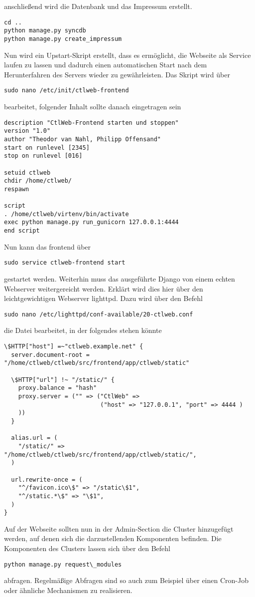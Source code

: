anschließend wird die Datenbank und das Impressum erstellt.
\begin{lstlisting}
cd ..
python manage.py syncdb
python manage.py create_impressum
\end{lstlisting}

Nun wird ein Upstart-Skript erstellt, dass es ermöglicht, die Webseite als
Service laufen zu lassen und dadurch einen automatischen Start nach dem
Herunterfahren des Servers wieder zu gewährleisten. Das Skript wird über 
\begin{lstlisting}
sudo nano /etc/init/ctlweb-frontend
\end{lstlisting}
bearbeitet, folgender Inhalt sollte danach eingetragen sein
\begin{lstlisting}
description "CtlWeb-Frontend starten und stoppen"
version "1.0"
author "Theodor van Nahl, Philipp Offensand"
start on runlevel [2345]
stop on runlevel [016]

setuid ctlweb
chdir /home/ctlweb/
respawn

script
. /home/ctlweb/virtenv/bin/activate
exec python manage.py run_gunicorn 127.0.0.1:4444
end script
\end{lstlisting}
Nun kann das frontend über 
\begin{lstlisting}
sudo service ctlweb-frontend start
\end{lstlisting}
gestartet werden.
Weiterhin muss das ausgeführte Django von einem echten Webserver weitergereicht
werden. Erklärt wird dies hier über den leichtgewichtigen Webserver lighttpd. 
Dazu wird über den Befehl
\begin{lstlisting}
sudo nano /etc/lighttpd/conf-available/20-ctlweb.conf
\end{lstlisting}
die Datei bearbeitet, in der folgendes stehen könnte
\begin{lstlisting}
\$HTTP["host"] =~"ctlweb.example.net" {
  server.document-root = "/home/ctlweb/ctlweb/src/frontend/app/ctlweb/static"

  \$HTTP["url"] !~ "/static/" {
    proxy.balance = "hash"
    proxy.server = ("" => ("CtlWeb" =>
                           ("host" => "127.0.0.1", "port" => 4444 )
    ))
  }

  alias.url = (
    "/static/" => "/home/ctlweb/ctlweb/src/frontend/app/ctlweb/static/",
  )

  url.rewrite-once = (
    "^/favicon.ico\$" => "/static\$1",
    "^/static.*\$" => "\$1",
  )
}
\end{lstlisting}

Auf der Webseite sollten nun in der Admin-Section die Cluster hinzugefügt werden,
auf denen sich die darzustellenden Komponenten befinden. Die Komponenten des
Clusters lassen sich über den Befehl
\begin{lstlisting}
python manage.py request\_modules
\end{lstlisting}
abfragen. Regelmäßige Abfragen sind so auch zum Beispiel über einen Cron-Job
oder ähnliche Mechanismen zu realisieren.

